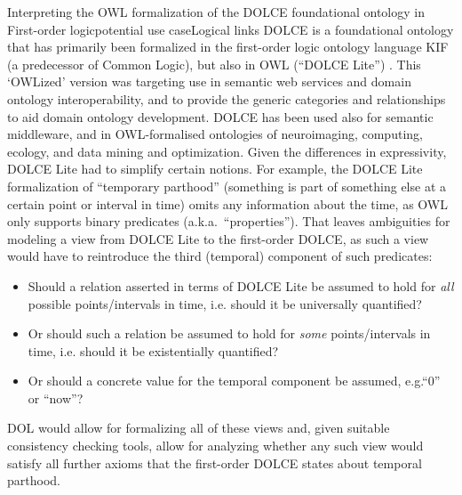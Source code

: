 \documentclass[%
\ifpretendfinal
final%
\else
draft%
\fi,
a4paper,
wd]{isov2}
\makeatletter
\newcommand*{\eg}{e.g.\@\xspace}
\newcommand*{\ie}{i.e.\@\xspace}
\makeatother
\begin{document}
\begin{usecase}{Interpreting the OWL formalization of the DOLCE foundational ontology in First-order logic}{potential use case}{Logical links}
  DOLCE is a foundational ontology that has primarily been formalized in the first-order logic ontology language KIF (a predecessor of Common Logic), but also in OWL (“DOLCE Lite”) . This ‘OWLized’ version was targeting use in semantic web services and domain ontology interoperability, and to provide the generic categories and relationships to aid domain ontology development. DOLCE has been used also for semantic middleware, and in OWL-formalised ontologies of neuroimaging, computing, ecology, and data mining and optimization.
  Given the differences in expressivity, DOLCE Lite had to simplify certain notions.  For example, the DOLCE Lite formalization of “temporary parthood” (something is part of something else at a certain point or interval in time) omits any information about the time, as OWL only supports binary predicates (a.k.a.\ “properties”).  That leaves ambiguities for modeling a view from DOLCE Lite to the first-order DOLCE, as such a view would have to reintroduce the third (temporal) component of such predicates:
  \begin{itemize}
  \item Should a relation asserted in terms of DOLCE Lite be assumed to hold for \emph{all} possible points/intervals in time, \ie should it be universally quantified?
  \item Or should such a relation be assumed to hold for \emph{some} points/intervals in time, \ie should it be existentially quantified?
  \item Or should a concrete value for the temporal component be assumed, \eg “0” or “now”?
  \end{itemize}
  
  DOL would allow for formalizing all of these views and, given suitable consistency checking tools, allow for analyzing whether any such view would satisfy all further axioms that the first-order DOLCE states about temporal parthood.
\end{usecase}
\end{document}
